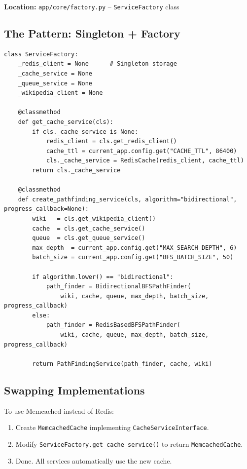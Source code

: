 \documentclass[11pt,a4paper]{article}
\begin{document}
\begin{notebox}
\textbf{Location:} \texttt{app/core/factory.py} -- \texttt{ServiceFactory} class
\end{notebox}

\subsection{The Pattern: Singleton + Factory}

\begin{lstlisting}[caption=ServiceFactory Implementation]
class ServiceFactory:
    _redis_client = None      # Singleton storage
    _cache_service = None
    _queue_service = None
    _wikipedia_client = None

    @classmethod
    def get_cache_service(cls):
        if cls._cache_service is None:
            redis_client = cls.get_redis_client()
            cache_ttl = current_app.config.get("CACHE_TTL", 86400)
            cls._cache_service = RedisCache(redis_client, cache_ttl)
        return cls._cache_service

    @classmethod
    def create_pathfinding_service(cls, algorithm="bidirectional", progress_callback=None):
        wiki   = cls.get_wikipedia_client()
        cache  = cls.get_cache_service()
        queue  = cls.get_queue_service()
        max_depth  = current_app.config.get("MAX_SEARCH_DEPTH", 6)
        batch_size = current_app.config.get("BFS_BATCH_SIZE", 50)

        if algorithm.lower() == "bidirectional":
            path_finder = BidirectionalBFSPathFinder(
                wiki, cache, queue, max_depth, batch_size, progress_callback)
        else:
            path_finder = RedisBasedBFSPathFinder(
                wiki, cache, queue, max_depth, batch_size, progress_callback)

        return PathFindingService(path_finder, cache, wiki)
\end{lstlisting}

\subsection{Swapping Implementations}

To use Memcached instead of Redis:
\begin{enumerate}[leftmargin=*, nosep]
    \item Create \texttt{MemcachedCache} implementing \texttt{CacheServiceInterface}.
    \item Modify \texttt{ServiceFactory.get\_cache\_service()} to return \texttt{MemcachedCache}.
    \item Done. All services automatically use the new cache.
\end{enumerate}
\end{document}
